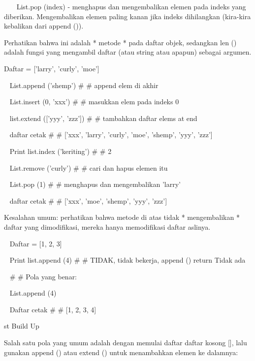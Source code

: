 ~~~ List.pop (index) - menghapus dan mengembalikan elemen pada indeks yang diberikan. Mengembalikan elemen paling kanan jika indeks dihilangkan (kira-kira kebalikan dari append ()). \par
\vspace{12pt}
Perhatikan bahwa ini adalah * metode * pada daftar objek, sedangkan len () adalah fungsi yang mengambil daftar (atau string atau apapun) sebagai argumen. \par
\vspace{12pt}
\vspace{12pt}
Daftar = ['larry', 'curly', 'moe'] \par
~ List.append ('shemp')    \#     \#   append elem di akhir \par
~ List.insert (0, 'xxx')    \#     \#   masukkan elem pada indeks 0 \par
~ list.extend (['yyy', 'zzz'])    \#     \#   tambahkan daftar elems at end \par
~ daftar cetak    \#     \#   ['xxx', 'larry', 'curly', 'moe', 'shemp', 'yyy', 'zzz'] \par
~ Print list.index ('keriting')    \#     \#   2 \par
\vspace{12pt}
~ List.remove ('curly')    \#     \#   cari dan hapus elemen itu \par
~ List.pop (1)    \#     \#   menghapus dan mengembalikan 'larry' \par
~ daftar cetak    \#     \#   ['xxx', 'moe', 'shemp', 'yyy', 'zzz'] \par
\vspace{12pt}
Kesalahan umum: perhatikan bahwa metode di atas tidak * mengembalikan * daftar yang dimodifikasi, mereka hanya memodifikasi daftar aslinya. \par
\vspace{12pt}
~ Daftar = [1, 2, 3] \par
~ Print list.append (4)    \#     \#   TIDAK, tidak bekerja, append () return Tidak ada \par
~    \#     \#   Pola yang benar: \par
~ List.append (4) \par
~ Daftar cetak    \#     \#   [1, 2, 3, 4] \par
st Build Up \par
\vspace{12pt}
Salah satu pola yang umum adalah dengan memulai daftar daftar kosong [], lalu gunakan append () atau extend () untuk menambahkan elemen ke dalamnya: \par
